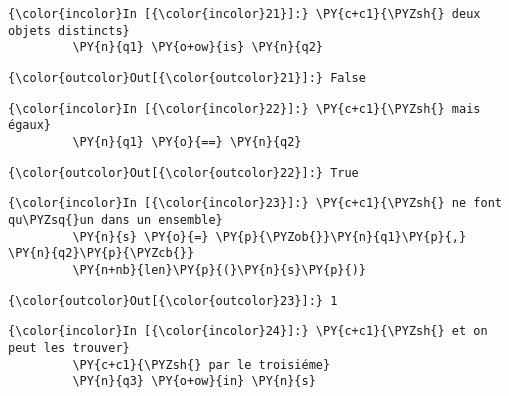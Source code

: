     \begin{Verbatim}[commandchars=\\\{\},frame=single,framerule=0.3mm,rulecolor=\color{cellframecolor}]
{\color{incolor}In [{\color{incolor}21}]:} \PY{c+c1}{\PYZsh{} deux objets distincts}
         \PY{n}{q1} \PY{o+ow}{is} \PY{n}{q2}
\end{Verbatim}


\begin{Verbatim}[commandchars=\\\{\},frame=single,framerule=0.3mm,rulecolor=\color{cellframecolor}]
{\color{outcolor}Out[{\color{outcolor}21}]:} False
\end{Verbatim}
            
    \begin{Verbatim}[commandchars=\\\{\},frame=single,framerule=0.3mm,rulecolor=\color{cellframecolor}]
{\color{incolor}In [{\color{incolor}22}]:} \PY{c+c1}{\PYZsh{} mais égaux}
         \PY{n}{q1} \PY{o}{==} \PY{n}{q2}
\end{Verbatim}


\begin{Verbatim}[commandchars=\\\{\},frame=single,framerule=0.3mm,rulecolor=\color{cellframecolor}]
{\color{outcolor}Out[{\color{outcolor}22}]:} True
\end{Verbatim}
            
    \begin{Verbatim}[commandchars=\\\{\},frame=single,framerule=0.3mm,rulecolor=\color{cellframecolor}]
{\color{incolor}In [{\color{incolor}23}]:} \PY{c+c1}{\PYZsh{} ne font qu\PYZsq{}un dans un ensemble}
         \PY{n}{s} \PY{o}{=} \PY{p}{\PYZob{}}\PY{n}{q1}\PY{p}{,} \PY{n}{q2}\PY{p}{\PYZcb{}}
         \PY{n+nb}{len}\PY{p}{(}\PY{n}{s}\PY{p}{)}
\end{Verbatim}


\begin{Verbatim}[commandchars=\\\{\},frame=single,framerule=0.3mm,rulecolor=\color{cellframecolor}]
{\color{outcolor}Out[{\color{outcolor}23}]:} 1
\end{Verbatim}
            
    \begin{Verbatim}[commandchars=\\\{\},frame=single,framerule=0.3mm,rulecolor=\color{cellframecolor}]
{\color{incolor}In [{\color{incolor}24}]:} \PY{c+c1}{\PYZsh{} et on peut les trouver}
         \PY{c+c1}{\PYZsh{} par le troisiéme}
         \PY{n}{q3} \PY{o+ow}{in} \PY{n}{s}
\end{Verbatim}


